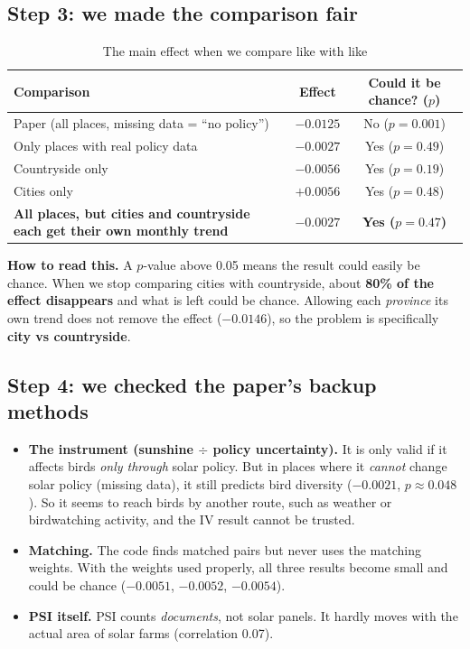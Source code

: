 \documentclass[11pt]{article}
\begin{document}
\subsection{Step 3: we made the comparison fair}
\begin{table}[H]\centering\small
\caption{The main effect when we compare like with like}
\begin{tabularx}{\linewidth}{>{\raggedright\arraybackslash}Xcc}
\toprule
Comparison & Effect & Could it be chance? ($p$)\\
\midrule
Paper (all places, missing data = ``no policy'') & $-0.0125$ & No ($p=0.001$)\\
Only places with real policy data & $-0.0027$ & Yes ($p=0.49$)\\
Countryside only & $-0.0056$ & Yes ($p=0.19$)\\
Cities only & $+0.0056$ & Yes ($p=0.48$)\\
\textbf{All places, but cities and countryside each get their own monthly trend} & $\mathbf{-0.0027}$ & \textbf{Yes ($p=0.47$)}\\
\bottomrule
\end{tabularx}
\end{table}

\begin{whybox}\small
\textbf{How to read this.} A $p$-value above 0.05 means the result could easily be chance. When we stop comparing cities with countryside, about \textbf{80\% of the effect disappears} and what is left could be chance. Allowing each \emph{province} its own trend does not remove the effect ($-0.0146$), so the problem is specifically \textbf{city vs countryside}.
\end{whybox}

\subsection{Step 4: we checked the paper's backup methods}
\begin{itemize}
\item \textbf{The instrument (sunshine $\div$ policy uncertainty).} It is only valid if it affects birds \emph{only through} solar policy. But in places where it \emph{cannot} change solar policy (missing data), it still predicts bird diversity ($-0.0021$, $p\approx0.048$). So it seems to reach birds by another route, such as weather or birdwatching activity, and the IV result cannot be trusted.
\item \textbf{Matching.} The code finds matched pairs but never uses the matching weights. With the weights used properly, all three results become small and could be chance ($-0.0051$, $-0.0052$, $-0.0054$).
\item \textbf{PSI itself.} PSI counts \emph{documents}, not solar panels. It hardly moves with the actual area of solar farms (correlation 0.07).
\end{itemize}
\end{document}
